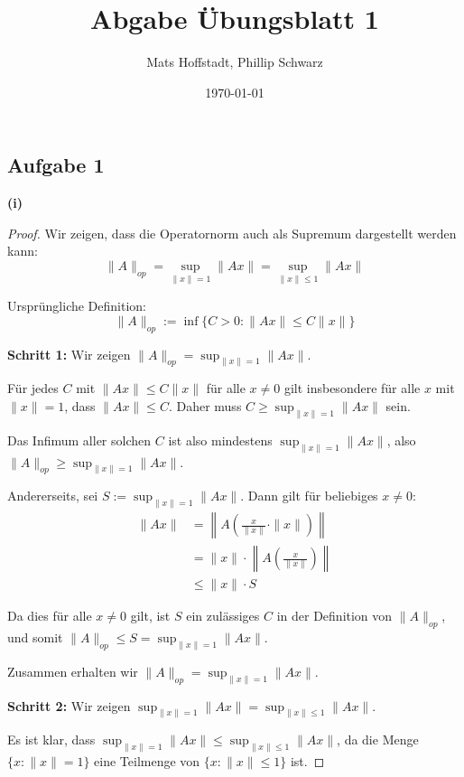 \documentclass{article}
\title{Abgabe Übungsblatt 1}
\author{Mats Hoffstadt, Phillip Schwarz}
\date{\today}
\begin{document}
\maketitle

\clearpage

\subsection*{Aufgabe 1}

\textbf{(i)}
\begin{proof}
    Wir zeigen, dass die Operatornorm auch als Supremum dargestellt werden kann:
    \begin{equation*}
    \|A\|_{op} = \sup_{\|x\|=1} \|Ax\| = \sup_{\|x\|\leq1} \|Ax\|
    \end{equation*}
    
    Ursprüngliche Definition:
    \begin{equation*}
    \|A\|_{op} := \inf\{C > 0 : \|Ax\| \leq C\|x\|\}
    \end{equation*}
    
    \textbf{Schritt 1:} Wir zeigen $\|A\|_{op} = \sup_{\|x\|=1} \|Ax\|$.
    
    Für jedes $C$ mit $\|Ax\| \leq C\|x\|$ für alle $x \neq 0$ gilt insbesondere für alle $x$ mit $\|x\|=1$, dass $\|Ax\| \leq C$. Daher muss $C \geq \sup_{\|x\|=1} \|Ax\|$ sein.
    
    Das Infimum aller solchen $C$ ist also mindestens $\sup_{\|x\|=1} \|Ax\|$, also $\|A\|_{op} \geq \sup_{\|x\|=1} \|Ax\|$.
    
    Andererseits, sei $S := \sup_{\|x\|=1} \|Ax\|$. Dann gilt für beliebiges $x \neq 0$:
    \begin{align*}
    \|Ax\| &= \left\|A\left(\frac{x}{\|x\|} \cdot \|x\|\right)\right\| \\
    &= \|x\| \cdot \left\|A\left(\frac{x}{\|x\|}\right)\right\| \\
    &\leq \|x\| \cdot S
    \end{align*}
    
    Da dies für alle $x \neq 0$ gilt, ist $S$ ein zulässiges $C$ in der Definition von $\|A\|_{op}$, und somit $\|A\|_{op} \leq S = \sup_{\|x\|=1} \|Ax\|$.
    
    Zusammen erhalten wir $\|A\|_{op} = \sup_{\|x\|=1} \|Ax\|$.
    
    \textbf{Schritt 2:} Wir zeigen $\sup_{\|x\|=1} \|Ax\| = \sup_{\|x\|\leq1} \|Ax\|$.
    
    Es ist klar, dass $\sup_{\|x\|=1} \|Ax\| \leq \sup_{\|x\|\leq1} \|Ax\|$, da die Menge $\{x : \|x\|=1\}$ eine Teilmenge von $\{x : \|x\|\leq1\}$ ist.
    

\end{proof}
\end{document}
